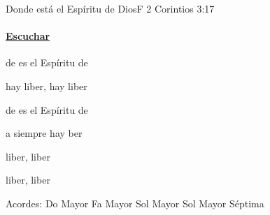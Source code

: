 \documentclass[12pt, spanish]{book}
\begin{document}
    \begin{song}{Donde está el Espíritu de Dios}{F}
        {} %
        {}
        {2 Corintios 3:17} %
        {}
        \ifChordBk
        \paragraph{\mbox{}\hfill\protect\href{https://open.spotify.com/intl-es/track/3cWdcVBkdDAx4PAwiodx3P}{Escuchar}\mbox{}\hfill}
        \fi


        \begin{SBOpGroup}
            de es el Espíritu de 

            hay liber, hay liber
        \end{SBOpGroup}

        \begin{SBChorus}
            de es el Espíritu de 

            a siempre hay ber
        \end{SBChorus}

        \begin{SBOpGroup}
            liber, liber

            liber, liber
        \end{SBOpGroup}


        \ifChordBk
        \begin{SBOpGroup}
            Acordes:
            \upchord{\C}\qquad Do Mayor \hfill
            \upchord{\F}\qquad Fa Mayor \hfill\null\break
            \upchord{\G}\qquad Sol Mayor \hfill
            \upchord{\Gseven}Sol Mayor S\'eptima \hfill\null\break
        \end{SBOpGroup}
        \fi
    \end{song}
\end{document}
